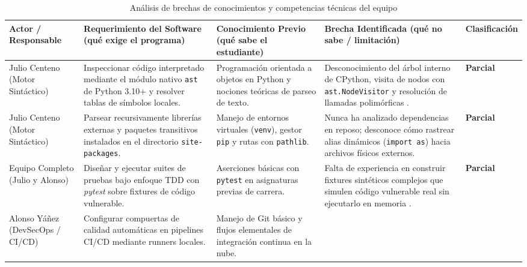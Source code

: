 \begin{table}[H]
\centering
\caption{Análisis de brechas de conocimientos y competencias técnicas del equipo}
\label{tab:analisis_brechas_u12}
\small
{}
\setlength{\tabcolsep}{3.5pt}
\renewcommand{\arraystretch}{0.95}
\begin{tabularx}{\textwidth}{>{\raggedright\arraybackslash}p{2.3cm} >{\raggedright\arraybackslash}p{3.5cm} >{\raggedright\arraybackslash}p{3.2cm} >{\raggedright\arraybackslash}X >{\centering\arraybackslash}p{1.6cm}}
\toprule
\textbf{Actor / Responsable} & 
\textbf{Requerimiento del Software (qué exige el programa)} & 
\textbf{Conocimiento Previo (qué sabe el estudiante)} & 
\textbf{Brecha Identificada (qué no sabe / limitación)} & 
\textbf{Clasificación} \\
\midrule
Julio Centeno \newline (Motor Sintáctico) & 
Inspeccionar código interpretado mediante el módulo nativo \texttt{ast} de Python 3.10+ y resolver tablas de símbolos locales. & 
Programación orientada a objetos en Python y nociones teóricas de parseo de texto. & 
Desconocimiento del árbol interno de CPython, visita de nodos con \texttt{ast.NodeVisitor} y resolución de llamadas polimórficas \parencite{salis2021pycg}. & 
\textbf{Parcial} \\
\addlinespace
Julio Centeno \newline (Motor Sintáctico) & 
Parsear recursivamente librerías externas y paquetes transitivos instalados en el directorio \texttt{site-packages}. & 
Manejo de entornos virtuales (\texttt{venv}), gestor \texttt{pip} y rutas con \texttt{pathlib}. & 
Nunca ha analizado dependencias en reposo; desconoce cómo rastrear alias dinámicos (\texttt{import as}) hacia archivos físicos externos. & 
\textbf{Parcial} \\
\addlinespace
Equipo Completo \newline (Julio y Alonso) & 
Diseñar y ejecutar suites de pruebas bajo enfoque TDD con \textit{pytest} sobre fixtures de código vulnerable. & 
Aserciones básicas con \texttt{pytest} en asignaturas previas de carrera. & 
Falta de experiencia en construir fixtures sintéticos complejos que simulen código vulnerable real sin ejecutarlo en memoria \parencite{myers2011art}. & 
\textbf{Parcial} \\
\addlinespace
Alonso Yáñez \newline (DevSecOps / CI/CD) & 
Configurar compuertas de calidad automáticas en pipelines CI/CD mediante runners locales. & 
Manejo de Git básico y flujos elementales de integración continua en la nube. & 

\end{tabularx}
\end{table}
